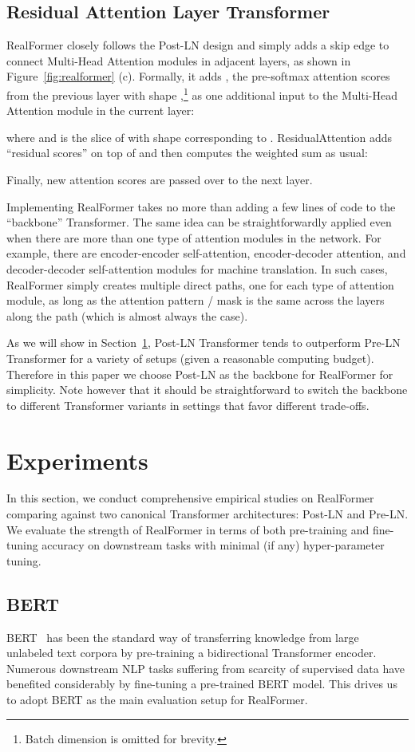 \documentclass[11pt,a4paper]{article}
\begin{document}
\subsection{Residual Attention Layer Transformer}
RealFormer closely follows the Post-LN design and simply adds a skip edge to connect Multi-Head Attention modules in adjacent layers, as shown in Figure~\ref{fig:realformer} (c). Formally, it adds , the pre-softmax attention scores from the previous layer with shape ,\footnote{Batch dimension is omitted for brevity.} as one additional input to the Multi-Head Attention module in the current layer:

where   and  is the slice of  with shape  corresponding to .
ResidualAttention adds ``residual scores'' on top of  and then computes the weighted sum as usual:

Finally, new attention scores  are passed over to the next layer.

Implementing RealFormer takes no more than adding a few lines of code to the ``backbone'' Transformer. The same idea can be straightforwardly applied even when there are more than one type of attention modules in the network. For example, there are encoder-encoder self-attention, encoder-decoder attention, and decoder-decoder self-attention modules for machine translation. In such cases, RealFormer simply creates multiple direct paths, one for each type of attention module, as long as the attention pattern / mask is the same across the layers along the path (which is almost always the case). 

As we will show in Section~\ref{sect:exp}, Post-LN Transformer tends to outperform Pre-LN Transformer for a variety of setups (given a reasonable computing budget). Therefore in this paper we choose Post-LN as the backbone for RealFormer for simplicity. Note however that it should be straightforward to switch the backbone to different Transformer variants in settings that favor different trade-offs.

\section{Experiments} \label{sect:exp}
In this section, we conduct comprehensive empirical studies on RealFormer comparing against two canonical Transformer architectures: Post-LN and Pre-LN. We evaluate the strength of RealFormer in terms of both pre-training and fine-tuning accuracy on downstream tasks with minimal (if any) hyper-parameter tuning.

\subsection{BERT}
BERT~\citep{Devlin-2019-bert} has been the standard way of transferring knowledge from large unlabeled text corpora by pre-training a bidirectional Transformer encoder. Numerous downstream NLP tasks suffering from scarcity of supervised data have benefited considerably by fine-tuning a pre-trained BERT model. This drives us to adopt BERT as the main evaluation setup for RealFormer.
\end{document}
